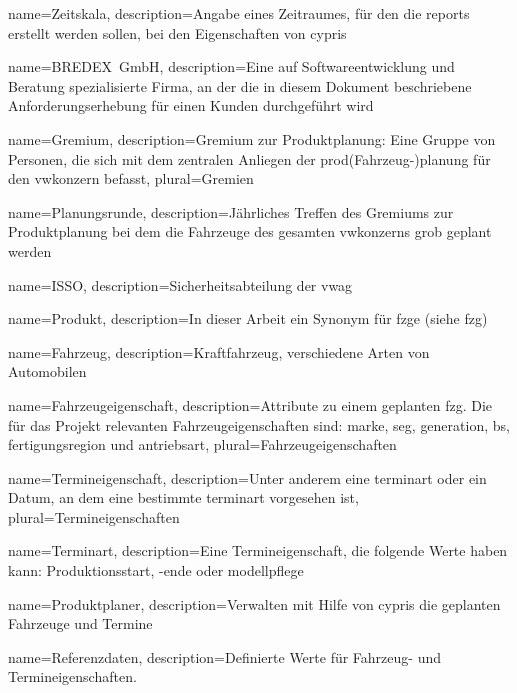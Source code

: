  {
	name=Zeitskala,
	description={Angabe eines Zeitraumes, f\"ur den die \gls{report}s erstellt werden sollen, bei den Eigenschaften von \gls{cypris}}}

 {
	name=\mbox{BREDEX GmbH},
	description={Eine auf Softwareentwicklung und Beratung spezialisierte Firma, an der die in diesem Dokument beschriebene Anforderungserhebung f\"ur einen Kunden durchgef\"uhrt wird}}
	
 {
	name=Gremium,
	description={Gremium  zur Produktplanung: Eine Gruppe von Personen, die sich mit dem zentralen Anliegen der \gls{prod}(Fahrzeug-)planung f\"ur den \gls{vwkonzern} befasst},
	plural=Gremien}
	
 {
	name=Planungsrunde,
	description={J\"ahrliches Treffen des Gremiums zur Produktplanung bei dem die Fahrzeuge des gesamten \gls{vwkonzern}s grob geplant werden}}

 {
	name=ISSO,
	description={Sicherheitsabteilung der \gls{vwag}}}

 {
	name=Produkt,
	description={In dieser Arbeit ein Synonym f\"ur \gls{fzg}e (siehe \gls{fzg})}}

 {
	name=Fahrzeug,
	description={Kraftfahrzeug, verschiedene Arten von Automobilen}}

 {
	name=Fahrzeugeigenschaft,
	description={Attribute zu einem geplanten \gls{fzg}. Die f\"ur das Projekt relevanten Fahrzeugeigenschaften sind: \gls{marke}, \gls{seg}, \gls{generation}, \gls{bs}, \gls{fertigungsregion} und \gls{antriebsart}},
	plural=Fahrzeugeigenschaften}
	
 {
	name=Termineigenschaft,
	description={Unter anderem eine \gls{terminart} oder ein Datum, an dem eine bestimmte \gls{terminart} vorgesehen ist},
	plural=Termineigenschaften}
	
 {
	name=Terminart,
	description={Eine Termineigenschaft, die folgende Werte haben kann: Produktionsstart, -ende oder \gls{modellpflege}}}

 {
	name=Produktplaner,
	description={Verwalten mit Hilfe von \gls{cypris} die geplanten Fahrzeuge und Termine}}
	
 {
	name=Referenzdaten,
	description={Definierte Werte für Fahrzeug- und Termineigenschaften.}}
	
